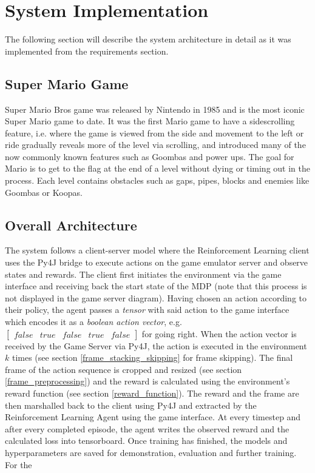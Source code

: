 \documentclass[notitlepage,a4paper,11pt]{article}
\begin{document}
	

\section{System Implementation}
The following section will describe the system architecture in detail as it was implemented from the requirements section.


\subsection{Super Mario Game}
Super Mario Bros game was released by Nintendo in 1985 and is the most iconic Super Mario game to date. It was the first Mario game to have a sidescrolling feature, i.e. where the game is viewed from the side and movement to the left or ride gradually reveals more of the level via scrolling, and introduced many of the now commonly known features such as Goombas and power ups. The goal for Mario is to get to the flag at the end of a level without dying or timing out in the process. Each level contains obstacles such as gaps, pipes, blocks and enemies like Goombas or Koopas. 


\subsection{Overall Architecture}
The system follows a client-server model where the Reinforcement Learning client uses the Py4J bridge to execute actions on the game emulator server and observe states and rewards. The client first initiates the environment via the game interface and receiving back the start state of the MDP (note that this process is not displayed in the game server diagram). Having chosen an action according to their policy, the agent passes a \textit{tensor} with said action to the game interface which encodes it as a \textit{boolean action vector}, e.g. $\begin{bmatrix} false & true & false & true & false\end{bmatrix}$ for going right. When the action vector is received by the Game Server via Py4J, the action is executed in the environment $k$ times (see section \ref{frame_stacking_skipping} for frame skipping). The final frame of the action sequence is cropped and resized (see section \ref{frame_preprocessing}) and the reward is calculated using the environment's reward function (see section \ref{reward_function}). The reward and the frame are then marshalled back to the client using Py4J and extracted by the Reinforcement Learning Agent using the game interface. At every timestep and after every completed episode, the agent writes the observed reward and the calculated loss into tensorboard. Once training has finished, the models and hyperparameters are saved for demonstration, evaluation and further training. For the 
\end{document}
